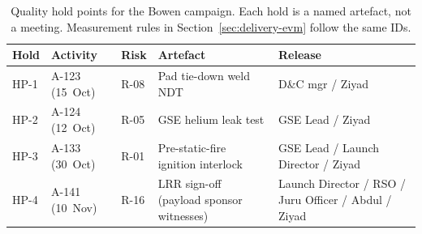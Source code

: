 \begin{table}[H]
\centering
\small
\caption[Quality hold points]{Quality hold points for the Bowen campaign. Each hold is a named artefact, not a meeting. Measurement rules in Section~\ref{sec:delivery-evm} follow the same IDs.}
\label{tab:holdpoints}
\begin{tabularx}{\textwidth}{@{}l l l >{\raggedright\arraybackslash}p{3.55cm} >{\raggedright\arraybackslash}X@{}}
\toprule
Hold & Activity & Risk & Artefact & Release \\
\midrule
HP-1 & A-123 (15~Oct) & R-08 & Pad tie-down weld NDT & D\&C mgr / Ziyad \\
HP-2 & A-124 (12~Oct) & R-05 & GSE helium leak test & GSE Lead / Ziyad \\
HP-3 & A-133 (30~Oct) & R-01 & Pre-static-fire ignition interlock & GSE Lead / Launch Director / Ziyad \\
HP-4 & A-141 (10~Nov) & R-16 & LRR sign-off (payload sponsor witnesses) & Launch Director / RSO / Juru Officer / Abdul / Ziyad \\
\bottomrule
\end{tabularx}
\end{table}
